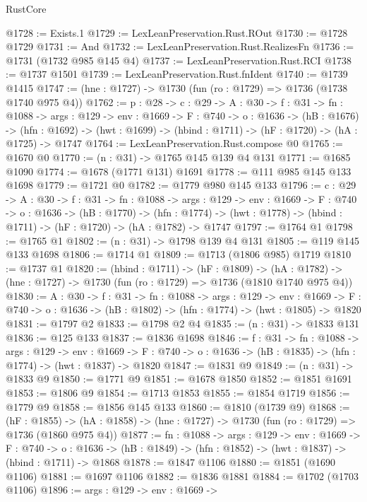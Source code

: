 \begin{lexlean}{RustCore}
\begin{coremodule}
@1728 := Exists.{1}
@1729 := LexLeanPreservation.Rust.ROut
@1730 := @1728 @1729
@1731 := And
@1732 := LexLeanPreservation.Rust.RealizesFn
@1736 := @1731 (@1732 @985 @145 @4)
@1737 := LexLeanPreservation.Rust.RCI
@1738 := @1737 @1501
@1739 := LexLeanPreservation.Rust.fnIdent
@1740 := @1739 @1415
@1747 := (hne : @1727) -> @1730 (fun (ro : @1729) => @1736 (@1738 @1740 @975 @4))
@1762 := {p : @28} ->
  {c : @29} ->
  {A : @30} ->
  {f : @31} ->
  {fn : @1088} ->
  {args : @129} ->
  {env : @1669} ->
  {F : @740} ->
  {o : @1636} ->
  (hB : @1676) ->
  (hfn : @1692) -> (hwt : @1699) -> (hbind : @1711) -> (hF : @1720) -> (hA : @1725) -> @1747
@1764 := LexLeanPreservation.Rust.compose @0
@1765 := @1670 @0
@1770 := (n : @31) -> @1765 @145 @139 @4 @131
@1771 := @1685 @1090
@1774 := @1678 (@1771 @131) @1691
@1778 := @111 @985 @145 @133 @1698
@1779 := @1721 @0
@1782 := @1779 @980 @145 @133
@1796 := {c : @29} ->
  {A : @30} ->
  {f : @31} ->
  {fn : @1088} ->
  {args : @129} ->
  {env : @1669} ->
  {F : @740} ->
  {o : @1636} ->
  (hB : @1770) ->
  (hfn : @1774) -> (hwt : @1778) -> (hbind : @1711) -> (hF : @1720) -> (hA : @1782) -> @1747
@1797 := @1764 @1
@1798 := @1765 @1
@1802 := (n : @31) -> @1798 @139 @4 @131
@1805 := @119 @145 @133 @1698
@1806 := @1714 @1
@1809 := @1713 (@1806 @985) @1719
@1810 := @1737 @1
@1820 := (hbind : @1711) ->
  (hF : @1809) ->
  (hA : @1782) -> (hne : @1727) -> @1730 (fun (ro : @1729) => @1736 (@1810 @1740 @975 @4))
@1830 := {A : @30} ->
  {f : @31} ->
  {fn : @1088} ->
  {args : @129} ->
  {env : @1669} ->
  {F : @740} -> {o : @1636} -> (hB : @1802) -> (hfn : @1774) -> (hwt : @1805) -> @1820
@1831 := @1797 @2
@1833 := @1798 @2 @4
@1835 := (n : @31) -> @1833 @131
@1836 := @125 @133
@1837 := @1836 @1698
@1846 := {f : @31} ->
  {fn : @1088} ->
  {args : @129} ->
  {env : @1669} ->
  {F : @740} -> {o : @1636} -> (hB : @1835) -> (hfn : @1774) -> (hwt : @1837) -> @1820
@1847 := @1831 @9
@1849 := (n : @31) -> @1833 @9
@1850 := @1771 @9
@1851 := @1678 @1850
@1852 := @1851 @1691
@1853 := @1806 @9
@1854 := @1713 @1853
@1855 := @1854 @1719
@1856 := @1779 @9
@1858 := @1856 @145 @133
@1860 := @1810 (@1739 @9)
@1868 := (hF : @1855) ->
  (hA : @1858) -> (hne : @1727) -> @1730 (fun (ro : @1729) => @1736 (@1860 @975 @4))
@1877 := {fn : @1088} ->
  {args : @129} ->
  {env : @1669} ->
  {F : @740} ->
  {o : @1636} -> (hB : @1849) -> (hfn : @1852) -> (hwt : @1837) -> (hbind : @1711) -> @1868
@1878 := @1847 @1106
@1880 := @1851 (@1690 @1106)
@1881 := @1697 @1106
@1882 := @1836 @1881
@1884 := @1702 (@1703 @1106)
@1896 := {args : @129} ->
  {env : @1669} ->

\end{coremodule}
\end{lexlean}

